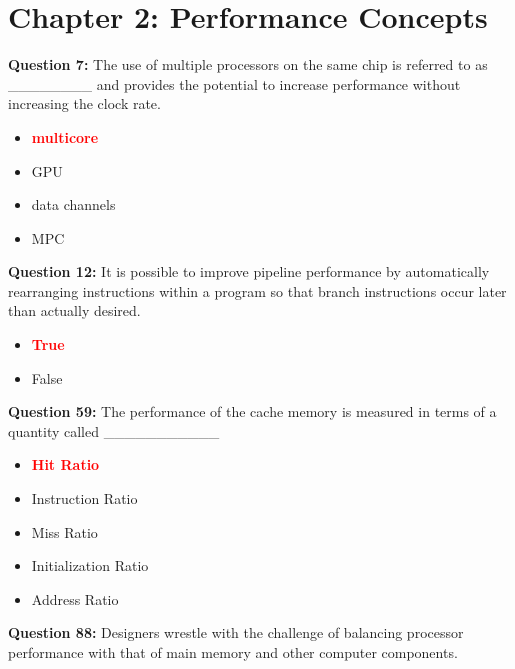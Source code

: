 \documentclass[12pt,a4paper]{article}
\begin{document}
\vspace{0.5cm}

\section{Chapter 2: Performance Concepts}

\textbf{Question 7:} The use of multiple processors on the same chip is referred to as ________ and provides the potential to increase performance without increasing the clock rate.

\begin{itemize}
    \item[\textbf{A.}] \textcolor{red}{\textbf{multicore}}
    \item[\textbf{B.}] GPU
    \item[\textbf{C.}] data channels
    \item[\textbf{D.}] MPC
\end{itemize}

\vspace{0.5cm}

\textbf{Question 12:} It is possible to improve pipeline performance by automatically rearranging instructions within a program so that branch instructions occur later than actually desired.

\begin{itemize}
    \item[\textbf{A.}] \textcolor{red}{\textbf{True}}
    \item[\textbf{B.}] False
\end{itemize}

\vspace{0.5cm}

\textbf{Question 59:} The performance of the cache memory is measured in terms of a quantity called ___________

\begin{itemize}
    \item[\textbf{A.}] \textcolor{red}{\textbf{Hit Ratio}}
    \item[\textbf{B.}] Instruction Ratio
    \item[\textbf{C.}] Miss Ratio
    \item[\textbf{D.}] Initialization Ratio
    \item[\textbf{E.}] Address Ratio
\end{itemize}

\vspace{0.5cm}

\textbf{Question 88:} Designers wrestle with the challenge of balancing processor performance with that of main memory and other computer components.
\end{document}

